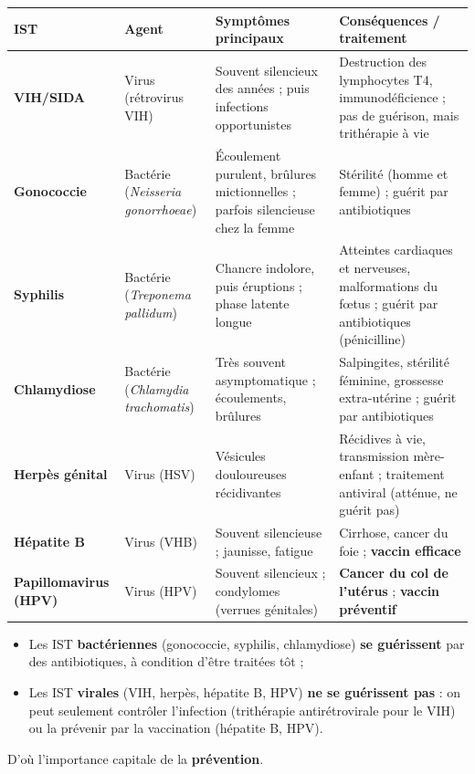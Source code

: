 \documentclass[11pt]{article}
\begin{document}
\begin{center}
\begin{tabularx}{\linewidth}{|l|X|X|X|}
\hline
\rowcolor{popblueL} \textbf{IST} & \textbf{Agent} & \textbf{Symptômes principaux} & \textbf{Conséquences / traitement} \\
\hline
\textbf{VIH/SIDA} & Virus (rétrovirus VIH) & Souvent silencieux des années ; puis infections opportunistes & Destruction des lymphocytes T4, immunodéficience ; pas de guérison, mais trithérapie à vie \\
\hline
\textbf{Gonococcie} & Bactérie (\emph{Neisseria gonorrhoeae}) & Écoulement purulent, brûlures mictionnelles ; parfois silencieuse chez la femme & Stérilité (homme et femme) ; guérit par antibiotiques \\
\hline
\textbf{Syphilis} & Bactérie (\emph{Treponema pallidum}) & Chancre indolore, puis éruptions ; phase latente longue & Atteintes cardiaques et nerveuses, malformations du fœtus ; guérit par antibiotiques (pénicilline) \\
\hline
\textbf{Chlamydiose} & Bactérie (\emph{Chlamydia trachomatis}) & Très souvent asymptomatique ; écoulements, brûlures & Salpingites, stérilité féminine, grossesse extra-utérine ; guérit par antibiotiques \\
\hline
\textbf{Herpès génital} & Virus (HSV) & Vésicules douloureuses récidivantes & Récidives à vie, transmission mère-enfant ; traitement antiviral (atténue, ne guérit pas) \\
\hline
\textbf{Hépatite B} & Virus (VHB) & Souvent silencieuse ; jaunisse, fatigue & Cirrhose, cancer du foie ; \textbf{vaccin efficace} \\
\hline
\textbf{Papillomavirus (HPV)} & Virus (HPV) & Souvent silencieux ; condylomes (verrues génitales) & \textbf{Cancer du col de l'utérus} ; \textbf{vaccin préventif} \\
\hline
\end{tabularx}
\end{center}

\begin{aretenir}
\begin{itemize}
\item Les IST \textbf{bactériennes} (gonococcie, syphilis, chlamydiose) \textbf{se guérissent} par des antibiotiques, à condition d'être traitées tôt ;
\item Les IST \textbf{virales} (VIH, herpès, hépatite B, HPV) \textbf{ne se guérissent pas} : on peut seulement contrôler l'infection (trithérapie antirétrovirale pour le VIH) ou la prévenir par la vaccination (hépatite B, HPV).
\end{itemize}
D'où l'importance capitale de la \textbf{prévention}.
\end{aretenir}
\end{document}
